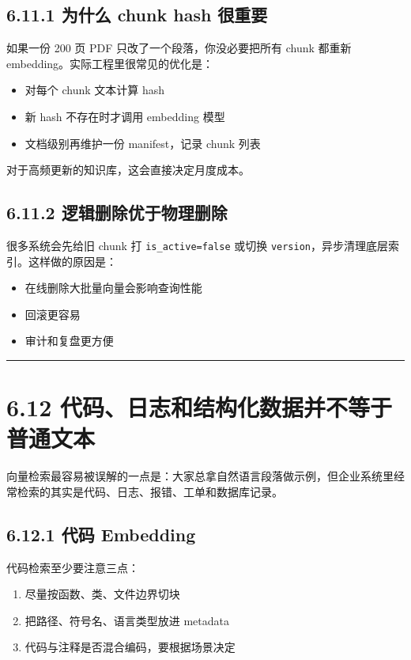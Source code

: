 \subsection{6.11.1 为什么 chunk hash 很重要}

如果一份 200 页 PDF 只改了一个段落，你没必要把所有 chunk 都重新 embedding。实际工程里很常见的优化是：


\begin{itemize}[leftmargin=2em]
\item 对每个 chunk 文本计算 hash
\item 新 hash 不存在时才调用 embedding 模型
\item 文档级别再维护一份 manifest，记录 chunk 列表
\end{itemize}

对于高频更新的知识库，这会直接决定月度成本。


\subsection{6.11.2 逻辑删除优于物理删除}

很多系统会先给旧 chunk 打 \texttt{is\_active=false} 或切换 \texttt{version}，异步清理底层索引。这样做的原因是：


\begin{itemize}[leftmargin=2em]
\item 在线删除大批量向量会影响查询性能
\item 回滚更容易
\item 审计和复盘更方便
\end{itemize}

\bigskip\hrule\bigskip

\section{6.12 代码、日志和结构化数据并不等于普通文本}

向量检索最容易被误解的一点是：大家总拿自然语言段落做示例，但企业系统里经常检索的其实是代码、日志、报错、工单和数据库记录。


\subsection{6.12.1 代码 Embedding}

代码检索至少要注意三点：


\begin{enumerate}[leftmargin=2em]
\item 尽量按函数、类、文件边界切块
\item 把路径、符号名、语言类型放进 metadata
\item 代码与注释是否混合编码，要根据场景决定
\end{enumerate}

